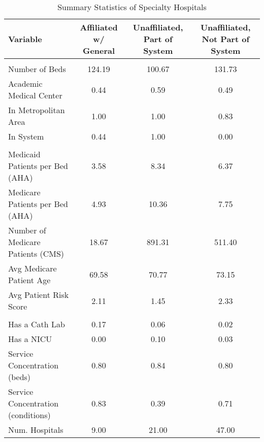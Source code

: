 \begin{table}[ht!]

\caption{Summary Statistics of Specialty Hospitals}
\centering
\begin{tabular}[t]{lccc}
\toprule
Variable & Affiliated w/ General & Unaffiliated, Part of System & Unaffiliated, Not Part of System\\
\midrule
\addlinespace[0.3em]
\multicolumn{4}{l}{\textbf{Characteristics}}\\
\hspace{1em}Number of Beds & 124.19 & 100.67 & 131.73\\
\hspace{1em}Academic Medical Center & 0.44 & 0.59 & 0.49\\
\hspace{1em}In Metropolitan Area & 1.00 & 1.00 & 0.83\\
\hspace{1em}In System & 0.44 & 1.00 & 0.00\\
\addlinespace[0.3em]
\multicolumn{4}{l}{\textbf{Patients}}\\
\hspace{1em}Medicaid Patients per Bed (AHA) & 3.58 & 8.34 & 6.37\\
\hspace{1em}Medicare Patients per Bed (AHA) & 4.93 & 10.36 & 7.75\\
\hspace{1em}Number of Medicare Patients (CMS) & 18.67 & 891.31 & 511.40\\
\hspace{1em}Avg Medicare Patient Age & 69.58 & 70.77 & 73.15\\
\hspace{1em}Avg Patient Risk Score & 2.11 & 1.45 & 2.33\\
\addlinespace[0.3em]
\multicolumn{4}{l}{\textbf{Services}}\\
\hspace{1em}Has a Cath Lab & 0.17 & 0.06 & 0.02\\
\hspace{1em}Has a NICU & 0.00 & 0.10 & 0.03\\
\hspace{1em}Service Concentration (beds) & 0.80 & 0.84 & 0.80\\
\hspace{1em}Service Concentration (conditions) & 0.83 & 0.39 & 0.71\\
Num. Hospitals & 9.00 & 21.00 & 47.00\\
\bottomrule
\end{tabular}
\end{table}
